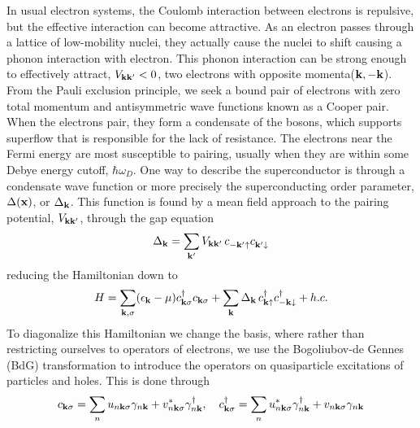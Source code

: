 In usual electron systems, the Coulomb interaction between electrons is repulsive, but the effective interaction can become attractive. 
As an electron passes through a lattice of low-mobility nuclei, they actually cause the nuclei to shift causing a phonon interaction with electron. This phonon interaction can be strong enough to effectively attract, $V_{\bf{k k'}}<0$, two electrons with opposite momenta($\bf{k},-\bf{k}$). From the Pauli exclusion principle, we seek a bound pair of electrons with zero total momentum and antisymmetric wave functions known as a Cooper pair. When the electrons pair, they form a condensate of the bosons, which supports superflow that is responsible for the lack of resistance. 
The electrons near the Fermi energy are most susceptible to pairing, usually when they are within some Debye energy cutoff, $\hbar \omega_D$. One way to describe the superconductor is through a condensate wave function or more precisely the superconducting order parameter, $\Delta(\bf{x})$, or $\Delta_{\bf{k}}$. This function is found by a mean field approach to the pairing potential, $V_{\bf{k k'}}$, through the gap equation
\begin{equation}
\Delta_{\bf{k}}=\sum_{\bf{k'}}
V_{\bf{k k'}}\,
c^{}_{-\bf{k'}\uparrow}
c^{}_{\bf{k'}\downarrow}
\end{equation}
reducing the Hamiltonian down to 
\begin{equation}
H=\sum_{\bf{k},\sigma} (\epsilon_{\bf{k}}-\mu)
c^{\dagger}_{\bf{k}\sigma}
c_{\bf{k}\sigma}+
\sum_{\bf{k}}
\Delta_{\bf{k}}\, 
c^{\dagger}_{\bf{k}\uparrow}
c^{\dagger}_{-\bf{k}\downarrow} +
h.c.
\end{equation}
To diagonalize this Hamiltonian we change the basis, where rather than restricting ourselves to operators of electrons, we use the Bogoliubov-de Gennes (BdG) transformation to introduce the operators on quasiparticle excitations of particles and holes. This is done through
\begin{equation}
c_{\bf{k}\sigma} = \sum_n u_{n \bf{k} \sigma} \gamma_{n\bf{k}}+v^\ast_{n \bf{k} \sigma} \gamma^\dagger_{n\bf{k}},\quad
c_{\bf{k}\sigma}^\dagger = \sum_n u_{n \bf{k} \sigma}^\ast \gamma_{n\bf{k}}^\dagger+v_{n \bf{k} \sigma} \gamma_{n\bf{k}}
\end{equation}
